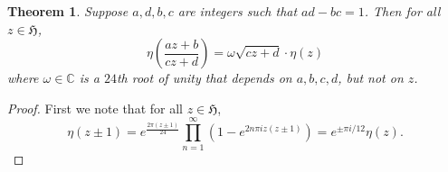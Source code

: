 \documentclass{article}
\newtheorem{theorem}{Theorem}
\begin{document}
\begin{theorem}
\label{thm:etatransform}
Suppose $a,d,b,c$ are integers such that $ad-bc=1$. Then for all $z \in \mathfrak{H}$,
\begin{equation}
\label{eqn:functionalsqrt}
\eta(\frac{az+b}{cz+d})=\omega \sqrt{cz+d} \cdot \eta(z)
\end{equation}
where $\omega \in \mathbb{C}$ is a $24$th root of unity that depends on $a,b,c,d$, but not on $z$.
\end{theorem}
\begin{proof}
First we note that
for all $z \in \mathfrak{H}$,
\begin{equation}
\label{eqn:addition}
\eta(z \pm 1)=e^{\frac{2\pi (z \pm 1)}{24}} \prod_{n=1}^\infty (1-e^{2n\pi iz(z \pm 1)})=e^{\pm \pi i/12}\eta(z).
\end{equation}


\end{proof}
\end{document}
